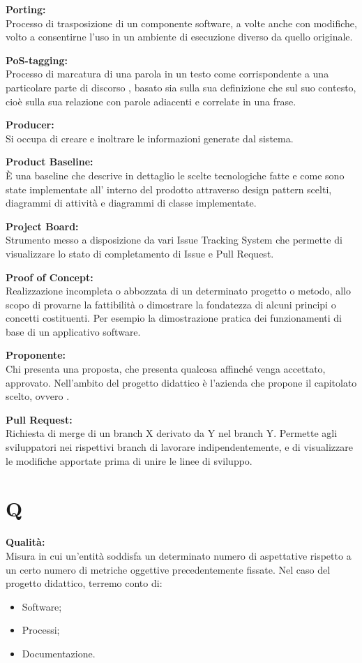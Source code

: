 \documentclass[a4paper, oneside, openany, dvipsnames, table]{article}
\begin{document}
\textbf{Porting:}\\	Processo di trasposizione di un componente software, a volte anche con modifiche, volto a consentirne l'uso in un ambiente di esecuzione diverso da quello originale.

\textbf{PoS-tagging:}\\	 Processo di marcatura di una parola in un testo come corrispondente a una particolare parte di discorso , basato sia sulla sua definizione che sul suo contesto, cioè sulla sua relazione con parole adiacenti e correlate in una frase.

\textbf{Producer:}\\	Si occupa di creare e inoltrare le informazioni generate dal sistema.

\textbf{Product Baseline:}\\	\`E una baseline che descrive in dettaglio le scelte tecnologiche fatte e come sono state implementate all' interno del prodotto attraverso design pattern scelti, diagrammi di attività e diagrammi di classe implementate.

\textbf{Project Board:}\\	Strumento messo a disposizione da vari Issue Tracking System che permette di visualizzare lo stato di completamento di Issue e Pull Request.

\textbf{Proof of Concept:}\\	Realizzazione incompleta o abbozzata di un determinato progetto o metodo, allo scopo di provarne la fattibilità o dimostrare la fondatezza di alcuni principi o concetti costituenti. Per esempio la dimostrazione pratica dei funzionamenti di base di un applicativo software.

\textbf{Proponente:}\\	Chi presenta una proposta, che presenta qualcosa affinché venga accettato, approvato. Nell'ambito del progetto didattico è l'azienda che propone il capitolato scelto, ovvero \proponente.

\textbf{Pull Request:}\\	Richiesta di merge di un branch X derivato da Y nel branch Y. Permette agli sviluppatori nei rispettivi branch di lavorare indipendentemente, e di visualizzare le modifiche apportate prima di unire le linee di sviluppo.

\newpage
\section{Q}
\textbf{Qualità:}\\	Misura in cui un'entità soddisfa un determinato numero di aspettative rispetto a un certo numero di metriche oggettive precedentemente fissate. Nel caso del progetto didattico, terremo conto di:
\begin{itemize}
	\item Software;
	\item Processi;
	\item Documentazione.
\end{itemize}
\end{document}
